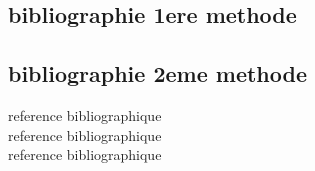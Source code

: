 \subsection{bibliographie 1ere methode}

\subsection{bibliographie 2eme methode}
reference bibliographique \cite{ref1} \\
reference bibliographique \cite{ref2} \\
reference bibliographique \cite{ref3} \\

